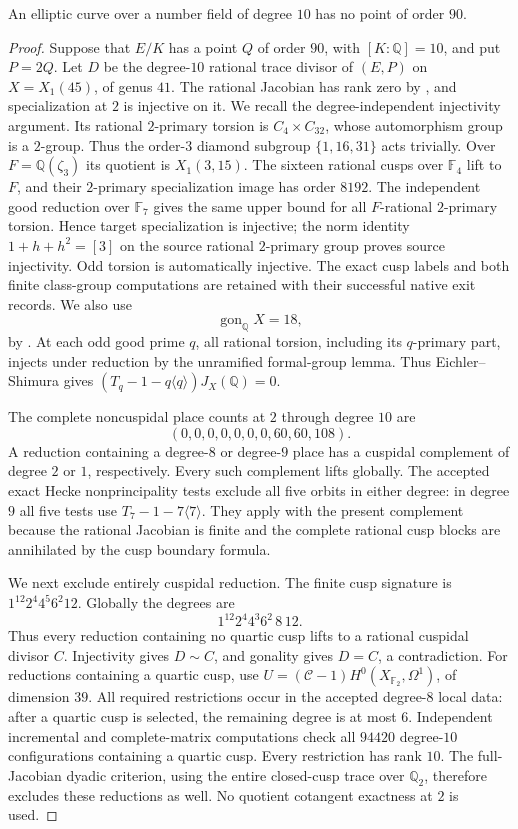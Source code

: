 \begin{proposition}\label{prop:decic-no90}
An elliptic curve over a number field of degree $10$ has no point
of order $90$.
\end{proposition}
\begin{proof}
Suppose that $E/K$ has a point $Q$ of order $90$, with
$[K:\mathbb Q]=10$, and put $P=2Q$.
Let $D$ be the degree-$10$ rational trace divisor of $(E,P)$
on $X=X_1(45)$, of genus $41$.
The rational Jacobian has rank zero by
\cite[Theorem~3.1]{DEHMZ}, and specialization at $2$ is injective
on it. We recall the degree-independent injectivity argument.
Its rational $2$-primary torsion is $C_4\times C_{32}$, whose
automorphism group is a $2$-group.
Thus the order-$3$ diamond subgroup $\{1,16,31\}$ acts trivially.
Over $F=\mathbb Q(\zeta_3)$ its quotient is $X_1(3,15)$.
The sixteen rational cusps over $\mathbb F_4$ lift to $F$,
and their $2$-primary specialization image has order $8192$.
The independent good reduction over $\mathbb F_7$ gives the same
upper bound for all $F$-rational $2$-primary torsion.
Hence target specialization is injective; the norm identity
$1+h+h^2=[3]$ on the source rational $2$-primary group proves
source injectivity. Odd torsion is automatically injective.
The exact cusp labels and both finite class-group computations
are retained with their successful native exit records.
We also use
\[
                  \operatorname{gon}_{\mathbb Q}X=18,
\]
by \cite[Theorem~D]{Varivoda26}.
At each odd good prime $q$, all rational torsion, including its
$q$-primary part, injects under reduction by the unramified
formal-group lemma. Thus Eichler--Shimura gives
$(T_q-1-q\langle q\rangle)J_X(\mathbb Q)=0$.

The complete noncuspidal place counts at $2$ through degree $10$
are
\[
                       (0,0,0,0,0,0,0,60,60,108).
\]
A reduction containing a degree-$8$ or degree-$9$ place has a
cuspidal complement of degree $2$ or $1$, respectively.
Every such complement lifts globally.
The accepted exact Hecke nonprincipality tests exclude all five
orbits in either degree: in degree $9$ all five tests use
$T_7-1-7\langle7\rangle$.
They apply with the present complement because the rational
Jacobian is finite and the complete rational cusp blocks are
annihilated by the cusp boundary formula.

We next exclude entirely cuspidal reduction.
The finite cusp signature is $1^{12}2^4 4^5 6^2 12$.
Globally the degrees are
\[
                     1^{12}2^4 4^3 6^2\,8\,12.
\]
Thus every reduction containing no quartic cusp lifts to a
rational cuspidal divisor $C$.
Injectivity gives $D\sim C$, and gonality gives $D=C$,
a contradiction.
For reductions containing a quartic cusp, use
$U=(\mathcal C-1)H^0(X_{\mathbb F_2},\Omega^1)$, of dimension $39$.
All required restrictions occur in the accepted degree-$8$
local data: after a quartic cusp is selected, the remaining
degree is at most $6$.
Independent incremental and complete-matrix computations check
all $94420$ degree-$10$ configurations containing a quartic cusp.
Every restriction has rank $10$.
The full-Jacobian dyadic criterion, using the entire closed-cusp
trace over $\mathbb Q_2$, therefore excludes these reductions
as well. No quotient cotangent exactness at $2$ is used.


\end{proof}
